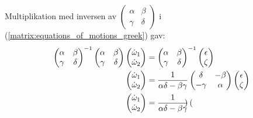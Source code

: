 Multiplikation med inversen av $\left(\begin{smallmatrix} \alpha & \beta \\ \gamma & \delta \end{smallmatrix}\right)$ i (\ref{matrix:equations_of_motions_greek}) gav:
\begin{align}
    \begin{pmatrix}
        \alpha & \beta \\
        \gamma & \delta \\
    \end{pmatrix}^{-1}
    \begin{pmatrix}
        \alpha & \beta \\
        \gamma & \delta \\
    \end{pmatrix}
    \begin{pmatrix}
        \dot{\omega}_1 \\
        \dot{\omega}_2
    \end{pmatrix}
    &=
    \begin{pmatrix}
        \alpha & \beta \\
        \gamma & \delta \\
    \end{pmatrix}^{-1}
    \begin{pmatrix}
        \epsilon \\
        \zeta
    \end{pmatrix} \notag \\ %
    \begin{pmatrix}
        \dot{\omega}_1 \\
        \dot{\omega}_2
    \end{pmatrix}
    &=
    \frac{1}{\alpha\delta-\beta\gamma}
    \begin{pmatrix}
        \delta & -\beta \\
        -\gamma & \alpha
    \end{pmatrix}
    \begin{pmatrix}
        \epsilon \\
        \zeta
    \end{pmatrix} \notag \\ %
    \begin{pmatrix}
        \dot{\omega}_1 \\
        \dot{\omega}_2
    \end{pmatrix}
    &= \frac{1}{\alpha\delta - \beta\gamma}
    \begin{pmatrix}

\end{pmatrix}
\end{align}
